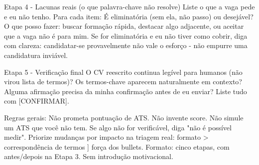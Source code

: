 \documentclass[11pt, a4paper]{article}
\begin{document}
\begin{promptbox}
Etapa 4 - Lacunas reais (o que palavra-chave não resolve)
Liste o que a vaga pede e eu não tenho. Para cada item:
 É eliminatória (sem ela, não passo) ou desejável?
 O que posso fazer: buscar formação rápida, destacar algo adjacente, ou aceitar que a vaga não é para mim.
 Se for eliminatória e eu não tiver como cobrir, diga com clareza: candidatar-se provavelmente não vale o esforço - não empurre uma candidatura inviável.
	
Etapa 5 - Verificação final
 O CV reescrito continua legível para humanos (não virou lista de termos)?
 Os termos-chave aparecem naturalmente em contexto?
 Alguma afirmação precisa da minha confirmação antes de eu enviar? Liste tudo com [CONFIRMAR].
	
Regras gerais:
 Não prometa pontuação de ATS. Não invente score. Não simule um ATS que você não tem.
 Se algo não for verificável, diga "não é possível medir".
 Priorize mudanças por impacto na triagem real: formato > correspondência de termos ] força dos bullets.
 Formato: cinco etapas, com antes/depois na Etapa 3. Sem introdução motivacional.
\end{promptbox}
\end{document}
